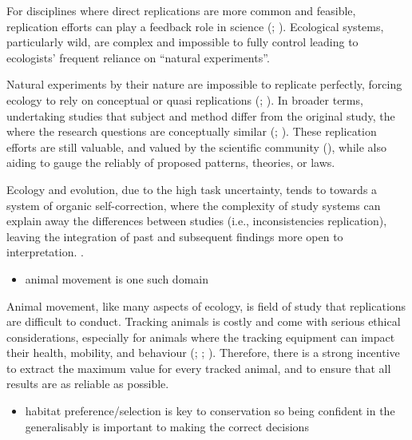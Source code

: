 \documentclass[10pt,a4paper]{article}
\providecommand{\tightlist}{%
  \setlength{\itemsep}{0pt}\setlength{\parskip}{0pt}}
\begin{document}
For disciplines where direct replications are more common and feasible, replication efforts can play a feedback role in science (; ).
Ecological systems, particularly wild, are complex and impossible to fully control leading to ecologists' frequent reliance on ``natural experiments''.

Natural experiments by their nature are impossible to replicate perfectly, forcing ecology to rely on conceptual or quasi replications (; ).
In broader terms, undertaking studies that subject and method differ from the original study, the where the research questions are conceptually similar (; ).
These replication efforts are still valuable, and valued by the scientific community (), while also aiding to gauge the reliably of proposed patterns, theories, or laws.

Ecology and evolution, due to the high task uncertainty, tends to towards a system of organic self-correction, where the complexity of study systems can explain away the differences between studies (i.e., inconsistencies replication), leaving the integration of past and subsequent findings more open to interpretation. .

\begin{itemize}
\tightlist
\item
  animal movement is one such domain
\end{itemize}

Animal movement, like many aspects of ecology, is field of study that replications are difficult to conduct.
Tracking animals is costly and come with serious ethical considerations, especially for animals where the tracking equipment can impact their health, mobility, and behaviour (; ; ).
Therefore, there is a strong incentive to extract the maximum value for every tracked animal, and to ensure that all results are as reliable as possible.

\begin{itemize}
\tightlist
\item
  habitat preference/selection is key to conservation so being confident in the generalisably is important to making the correct decisions
\end{itemize}
\end{document}
